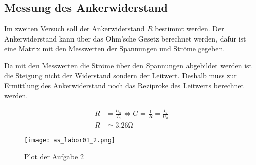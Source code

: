 \subsection{Messung des Ankerwiderstand}

Im zweiten Versuch soll der Ankerwiderstand $R$ bestimmt werden.
Der Ankerwiderstand kann über das Ohm'sche Gesetz berechnet werden,
dafür ist eine Matrix mit den Messwerten der Spannungen und Ströme gegeben.

Da mit den Messwerten die Ströme über den Spannungen abgebildet werden ist die
Steigung nicht der Widerstand sondern der Leitwert. Deshalb muss zur Ermittlung
des Ankerwiderstand noch das Reziproke des Leitwerts berechnet werden.

\begin{equation} \label{eq121}
    \begin{split}
        R&=\frac{U_a}{I_a} \Leftrightarrow G=\frac{1}{R}=\frac{I_a}{U_a}\\
        R&\simeq 3.26 \mathrm{\Omega}
    \end{split}
\end{equation}

\begin{figure}[H]
 \centering
 \texttt{[image: as\_labor01\_2.png]}
 \caption{Plot der Aufgabe 2}
 \label{fig:PlotAufgabe2}
\end{figure}